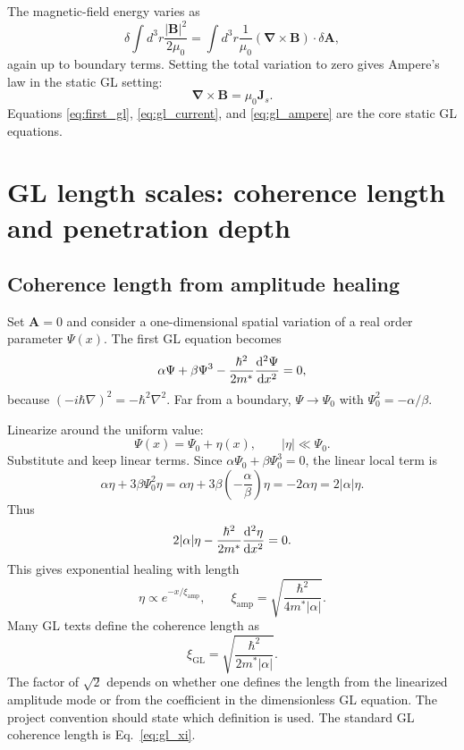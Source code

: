 \documentclass[11pt]{article}
\numberwithin{equation}{section}
\newcommand{\Avec}{\bm{A}}
\newcommand{\Bvec}{\bm{B}}
\newcommand{\Jvec}{\bm{J}}
\renewcommand{\grad}{\bm{\nabla}}
\newcommand{\xiGL}{\xi_{\mathrm{GL}}}
\newcommand{\Ord}{\Psi}
\begin{document}
The magnetic-field energy varies as
\begin{equation}
\delta\int d^3r\frac{|\Bvec|^2}{2\mu_0}=\int d^3r\frac{1}{\mu_0}(\grad\times\Bvec)\cdot\delta\Avec,
\end{equation}
again up to boundary terms. Setting the total variation to zero gives Ampere's law in the static GL setting:
\begin{equation}
\boxed{\grad\times\Bvec=\mu_0\Jvec_s.}
\label{eq:gl_ampere}
\end{equation}
Equations \eqref{eq:first_gl}, \eqref{eq:gl_current}, and \eqref{eq:gl_ampere} are the core static GL equations.

\section{GL length scales: coherence length and penetration depth}

\subsection{Coherence length from amplitude healing}

Set $\Avec=0$ and consider a one-dimensional spatial variation of a real order parameter $\Ord(x)$. The first GL equation becomes
\begin{equation}
\alpha\Ord+\beta\Ord^3-\frac{\hbar^2}{2m^*}\dv[2]{\Ord}{x}=0,
\end{equation}
because $(-i\hbar\nabla)^2=-\hbar^2\nabla^2$. Far from a boundary, $\Ord\to\Ord_0$ with $\Ord_0^2=-\alpha/\beta$.

Linearize around the uniform value:
\begin{equation}
\Ord(x)=\Ord_0+\eta(x),
\qquad |\eta|\ll\Ord_0.
\end{equation}
Substitute and keep linear terms. Since $\alpha\Ord_0+\beta\Ord_0^3=0$, the linear local term is
\begin{equation}
\alpha\eta+3\beta\Ord_0^2\eta=\alpha\eta+3\beta\left(-\frac{\alpha}{\beta}\right)\eta=-2\alpha\eta=2|\alpha|\eta.
\end{equation}
Thus
\begin{equation}
2|\alpha|\eta-\frac{\hbar^2}{2m^*}\dv[2]{\eta}{x}=0.
\end{equation}
This gives exponential healing with length
\begin{equation}
\eta\propto e^{-x/\xi_{\mathrm{amp}}},
\qquad
\xi_{\mathrm{amp}}=\sqrt{\frac{\hbar^2}{4m^*|\alpha|}}.
\end{equation}
Many GL texts define the coherence length as
\begin{equation}
\boxed{\xiGL=\sqrt{\frac{\hbar^2}{2m^*|\alpha|}}.}
\label{eq:gl_xi}
\end{equation}
The factor of $\sqrt{2}$ depends on whether one defines the length from the linearized amplitude mode or from the coefficient in the dimensionless GL equation. The project convention should state which definition is used. The standard GL coherence length is Eq.~\eqref{eq:gl_xi}.
\end{document}
